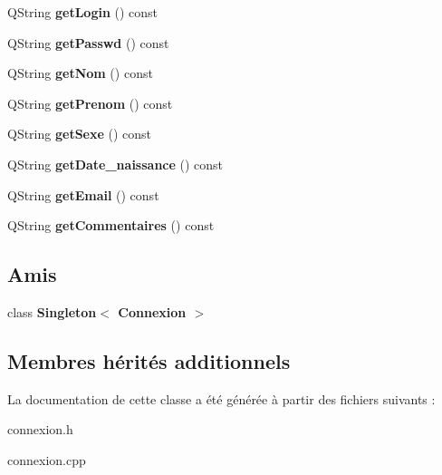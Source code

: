 \begin{DoxyCompactItemize}
\item 
\hypertarget{class_connexion_a4a19b40a17e3590b65ea83248291d9f9}{Q\+String {\bfseries get\+Login} () const }\label{class_connexion_a4a19b40a17e3590b65ea83248291d9f9}

\item 
\hypertarget{class_connexion_a559bc5706037b5928eee6c079f83720c}{Q\+String {\bfseries get\+Passwd} () const }\label{class_connexion_a559bc5706037b5928eee6c079f83720c}

\item 
\hypertarget{class_connexion_ab957cd2da042d7ff62e563ad548e0e32}{Q\+String {\bfseries get\+Nom} () const }\label{class_connexion_ab957cd2da042d7ff62e563ad548e0e32}

\item 
\hypertarget{class_connexion_a49af3f021e0034da75fb95dde5610865}{Q\+String {\bfseries get\+Prenom} () const }\label{class_connexion_a49af3f021e0034da75fb95dde5610865}

\item 
\hypertarget{class_connexion_a3da79d1264dbe24afa1b2b3a77d00f36}{Q\+String {\bfseries get\+Sexe} () const }\label{class_connexion_a3da79d1264dbe24afa1b2b3a77d00f36}

\item 
\hypertarget{class_connexion_a0343b541b2770d6545ace11a8bcdad85}{Q\+String {\bfseries get\+Date\+\_\+naissance} () const }\label{class_connexion_a0343b541b2770d6545ace11a8bcdad85}

\item 
\hypertarget{class_connexion_a88f0556be9e142edcce90de4b48c0255}{Q\+String {\bfseries get\+Email} () const }\label{class_connexion_a88f0556be9e142edcce90de4b48c0255}

\item 
\hypertarget{class_connexion_ae84dc007affc87f4d4639b4a018e1d18}{Q\+String {\bfseries get\+Commentaires} () const }\label{class_connexion_ae84dc007affc87f4d4639b4a018e1d18}

\end{DoxyCompactItemize}
\subsection*{Amis}
\begin{DoxyCompactItemize}
\item 
\hypertarget{class_connexion_aa45b32173e97ceffd41065ae6c80a029}{class {\bfseries Singleton$<$ Connexion $>$}}\label{class_connexion_aa45b32173e97ceffd41065ae6c80a029}

\end{DoxyCompactItemize}
\subsection*{Membres hérités additionnels}


La documentation de cette classe a été générée à partir des fichiers suivants \+:\begin{DoxyCompactItemize}
\item 
connexion.\+h\item 
connexion.\+cpp\end{DoxyCompactItemize}
